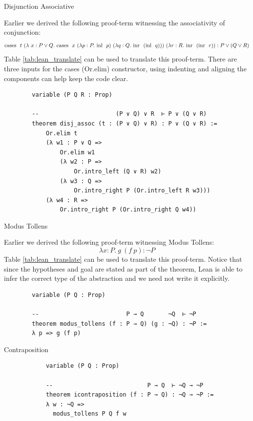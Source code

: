 \documentclass{book}
\begin{document}
    \begin{eg}{Disjunction Associative}
        
        Earlier we derived the following proof-term witnessing the associativity of conjunction:
        $$ \text{cases } \ t \ (\lambda \ x : P \lor Q. \ \text{cases } \ x \ (\lambda p : P. \ \text{inl } \ p) \ (\lambda q : Q. \ \text{inr } \ (\text{inl } \ q))) \ (\lambda r : R. \ \text{inr } \ (\text{inr } \ r)) : P \lor (Q \lor R) $$
        Table \ref{tab:lean_translate} can be used to translate this proof-term. There are three inputs for the cases (Or.elim) constructor, using indenting and aligning the components can help keep the code clear. 

        \begin{lstlisting}
        variable (P Q R : Prop)
        
        --                      (P ∨ Q) ∨ R  ⊢ P ∨ (Q ∨ R)
        theorem disj_assoc (t : (P ∨ Q) ∨ R) : P ∨ (Q ∨ R) :=
            Or.elim t
            (λ w1 : P ∨ Q =>
                Or.elim w1
                (λ w2 : P =>
                    Or.intro_left (Q ∨ R) w2)
                (λ w3 : Q =>
                    Or.intro_right P (Or.intro_left R w3)))
            (λ w4 : R =>
                Or.intro_right P (Or.intro_right Q w4))
        \end{lstlisting}        
    \end{eg}

    \begin{eg}{Modus Tollens}
        
        Earlier we derived the following proof-term witnessing Modus Tollens:
        $$ \lambda x : P. \ g \ (f \ p) : \lnot P $$
        Table \ref{tab:lean_translate} can be used to translate this proof-term. Notice that since the hypotheses and goal are stated as part of the theorem, Lean is able to infer the correct type of the abstraction and we need not write it explicitly. 

        \begin{lstlisting}
        variable (P Q : Prop)
        
        --                         P → Q       ¬Q  ⊢ ¬P
        theorem modus_tollens (f : P → Q) (g : ¬Q) : ¬P :=
        λ p => g (f p)
        \end{lstlisting}        
    \end{eg}

    \begin{eg}{Contraposition}
        \begin{lstlisting}
            variable (P Q : Prop)
            
            --                           P → Q  ⊢ ¬Q → ¬P
            theorem icontraposition (f : P → Q) : ¬Q → ¬P :=
            λ w : ¬Q =>
              modus_tollens P Q f w
            \end{lstlisting}    
    \end{eg}
    
\end{document}
